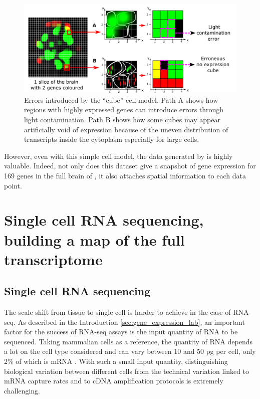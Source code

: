     \begin{figure}[h]
\centerline{\includegraphics[width=1.3\linewidth]{gfx/chapter2/cubeserrors.png}}
\caption{Errors introduced by the ``cube'' cell model. Path A shows how regions with highly expressed genes can introduce errors through light contamination. Path B shows how some cubes may appear artificially void of expression because of the uneven distribution of transcripts inside the cytoplasm especially for large cells.}\label{fig:cubeserrors}
	\end{figure}
	
	However, even with this simple cell model, the data generated by \cite{Tomer10} is highly valuable. Indeed, not only does this dataset give a snapshot of gene expression for 169 genes in the full brain of \platy{}, it also attaches spatial information to each data point.\\

\section{Single cell RNA sequencing, building a map of the full transcriptome}\label{sec:single_cell_rnaseq}
  \subsection{Single cell RNA sequencing}
	The scale shift from tissue to single cell is harder to achieve in the case of RNA-seq. As described in the Introduction \ref{sec:gene_expression_lab}, an important factor for the success of RNA-seq assays is the input quantity of RNA to be sequenced. Taking mammalian cells as a reference, the quantity of RNA depends a lot on the cell type considered and can vary between 10 and 50 pg per cell, only 2\% of which is mRNA \cite{iscove02,islam11}. With such a small input quantity, distinguishing biological variation between different cells from the technical variation linked to mRNA capture rates and to cDNA amplification protocols is extremely challenging.\\

